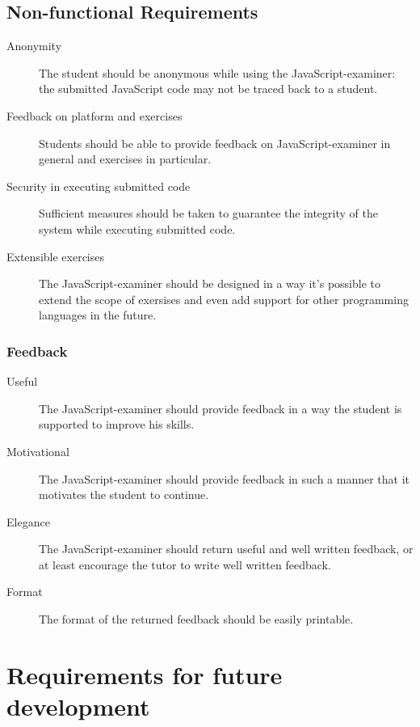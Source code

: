 \subsection{Non-functional Requirements}
\begin{description}
  \item[Anonymity] The student should be anonymous while using the
    JavaScript-examiner: the submitted JavaScript code may not be traced back
    to a student.
  \item[Feedback on platform and exercises] Students should be able to provide
    feedback on JavaScript-examiner in general and exercises in particular.
  \item[Security in executing submitted code] Sufficient measures should be
    taken to guarantee the integrity of the system while executing submitted
    code.
  \item[Extensible exercises] The JavaScript-examiner should be designed in a
    way it's possible to extend the scope of exersises and even add support for
    other programming languages in the future. 
\end{description}

\subsubsection{Feedback}
\begin{description}
  \item[Useful] The JavaScript-examiner should provide feedback in a way
    the student is supported to improve his skills.
  \item[Motivational] The JavaScript-examiner should provide feedback in such a
    manner that it motivates the student to continue.
  \item[Elegance] The JavaScript-examiner should return useful and well written 
    feedback, or at least encourage the tutor to write well written feedback.
  \item[Format] The format of the returned feedback should be easily printable.
\end{description}

\section{Requirements for future development}
